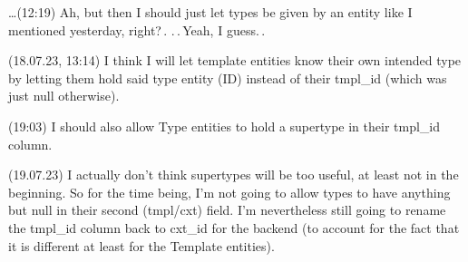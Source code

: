 \documentclass{report}
\begin{document}
\ldots (12:19) Ah, but then I should just let types be given by an entity like I mentioned yesterday, right?\,. .\,.\,Yeah, I guess.\,.

(18.07.23, 13:14) I think I will let template entities know their own intended type by letting them hold said type entity (ID) instead of their tmpl\_id (which was just null otherwise).


(19:03) I should also allow Type entities to hold a supertype in their tmpl\_id column.

(19.07.23) I actually don't think supertypes will be too useful, at least not in the beginning. So for the time being, I'm not going to allow types to have anything but null in their second (tmpl/cxt) field. I'm nevertheless still going to rename the tmpl\_id column back to cxt\_id for the backend (to account for the fact that it is different at least for the Template entities).



\end{document}
